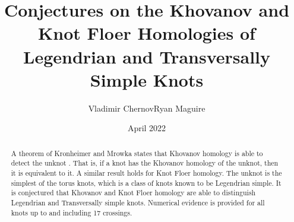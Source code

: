 \documentclass{article}
\title{Conjectures on the Khovanov and Knot Floer Homologies of
       Legendrian and Transversally Simple Knots}
\author{Vladimir Chernov\hspace{2em}Ryan Maguire}
\date{April 2022}
\theoremstyle{plain}
\begin{document}
    \maketitle
    \tableofcontents
    \begin{abstract}
        \noindent
        A theorem of Kronheimer and Mrowka states that Khovanov homology is
        able to detect the unknot \cite{kronheimermrowka2010}.
        That is, if a knot has the Khovanov homology of the unknot, then it is
        equivalent to it. A similar result holds for Knot Floer
        homology. The unknot is the simplest of the torus knots, which is a
        class of knots known to be Legendrian simple. It is conjectured that
        Khovanov and Knot Floer homology are able to distinguish Legendrian
        and Transversally simple knots. Numerical evidence is provided for
        all knots up to and including 17 crossings. 
    \end{abstract}
\end{document}
